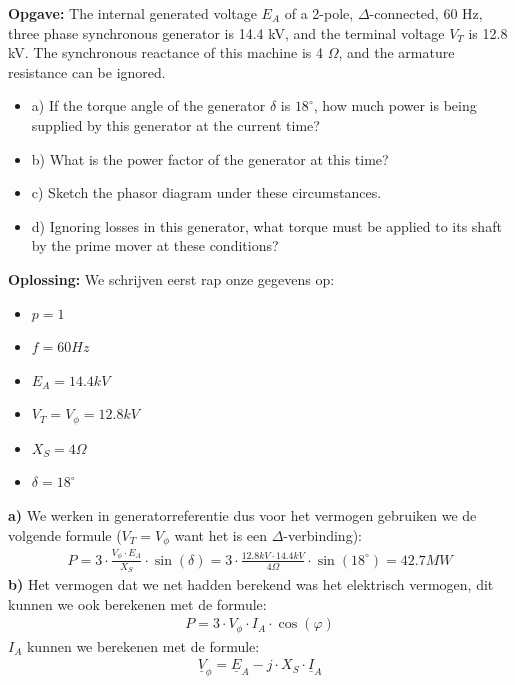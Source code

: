 \begin{oefenblok}
\textbf{Opgave:}
\newline
The internal generated voltage $E_A$ of a 2-pole, $\Delta$-connected, 60 Hz, three phase
synchronous generator is 14.4 kV, and the terminal voltage $V_T$ is 12.8 kV.
The synchronous reactance of this machine is 4 $\Omega$, and the armature resistance can
be ignored.
\begin{itemize}
 \item a) If the torque angle of the generator $\delta$ is $18^\circ$, how much power is
 being supplied by this generator at the current time?
 \item b) What is the power factor of the generator at this time?
 \item c) Sketch the phasor diagram under these circumstances.
 \item d) Ignoring losses in this generator, what torque must be applied to its shaft by
 the prime mover at these conditions?
\end{itemize}
\textbf{Oplossing:}
\newline
We schrijven eerst rap onze gegevens op:
\begin{itemize}
    \item $p = 1$
    \item $f = 60 Hz$
    \item $E_A = 14.4 kV$
    \item $V_T = V_\phi = 12.8 kV$
    \item $X_S = 4 \Omega$
    \item $\delta = 18^\circ$
\end{itemize}
\textbf{a)}
We werken in generatorreferentie dus voor het vermogen gebruiken we de volgende formule
($V_T = V_\phi$ want het is een $\Delta$-verbinding):
\begin{align*}
    P = 3 \cdot \frac{V_\phi \cdot E_A}{X_S} \cdot \sin(\delta) = 3 \cdot \frac{12.8 kV \cdot 14.4 kV}{4 \Omega} \cdot \sin(18^\circ) = 42.7 MW
\end{align*}
\textbf{b)}
Het vermogen dat we net hadden berekend was het elektrisch vermogen, dit kunnen we ook
berekenen met de formule:
\begin{align*}
    P = 3 \cdot V_\phi \cdot I_A \cdot \cos(\varphi)
\end{align*}
$I_A$ kunnen we berekenen met de formule:
\begin{align*}
    \underline{V}_{\phi} = \underline{E}_A - j \cdot X_S \cdot \underline{I}_A \\

\end{align*}
\end{oefenblok}
